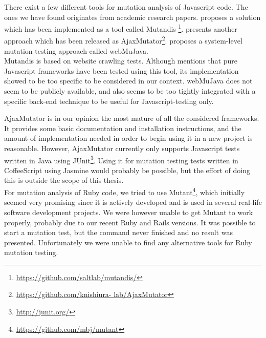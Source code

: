 \label{sec:choices_mutation}

There exist a few different tools for mutation analysis of Javascript
code. The ones we have found originates from academic research papers.
\citet{paper:mutandis} proposes a solution which has been implemented as
a tool called Mutandis
\footnote{\url{https://github.com/saltlab/mutandis/}}.
\citet{paper:ajaxmutator} presents another approach which has been
released as AjaxMutator\footnote{\url{https://github.com/knishiura-
lab/AjaxMutator}}. \citet{paper:webmujava} proposes a system-level
mutation testing approach called webMuJava.\\

Mutandis is based on website crawling tests. Although
\citeauthor{paper:mutandis} mentions that pure Javascript frameworks
have been tested using this tool, its implementation showed to be too
specific to be considered in our context. webMuJava does not seem to be
publicly available, and also seems to be too tightly integrated with a
specific back-end technique to be useful for Javascript-testing only.

AjaxMutator is in our opinion the most mature of all the considered
frameworks. It provides some basic documentation and installation
instructions, and the amount of implementation needed in order to begin
using it in a new project is reasonable. However, AjaxMutator currently
only supports Javascript tests written in Java using
JUnit\footnote{\url{http://junit.org/}}. Using it for mutation testing
tests written in CoffeeScript using Jasmine would probably be possible,
but the effort of doing this is outside the scope of this thesis.\\

For mutation analysis of Ruby code, we tried to use
Mutant\footnote{\url{https://github.com/mbj/mutant}}, which initially
seemed very promising since it is actively developed and is used in
several real-life software development projects. We were however unable
to get Mutant to work properly, probably due to our recent Ruby and
Rails versions. It was possible to start a mutation test, but the
command never finished and no result was presented. Unfortunately we
were unable to find any alternative tools for Ruby mutation testing.\\
